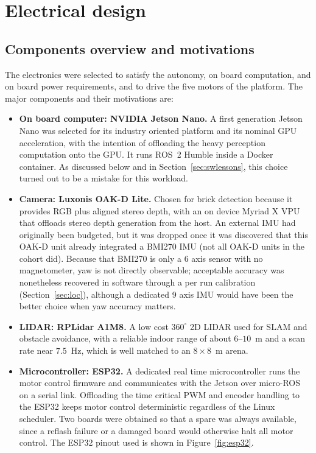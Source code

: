 \documentclass[11pt]{article}
\begin{document}
\section{Electrical design}\label{sec:electrical}

\subsection{Components overview and motivations}
The electronics were selected to satisfy the autonomy, on board computation, and on board power requirements, and to drive the five motors of the platform. The major components and their motivations are:
\begin{itemize}[noitemsep]
    \item \textbf{On board computer: NVIDIA Jetson Nano.} A first generation Jetson Nano was selected for its industry oriented platform and its nominal GPU acceleration, with the intention of offloading the heavy perception computation onto the GPU. It runs ROS~2 Humble inside a Docker container. As discussed below and in Section~\ref{sec:swlessons}, this choice turned out to be a mistake for this workload.
    \item \textbf{Camera: Luxonis OAK-D Lite.} Chosen for brick detection because it provides RGB plus aligned stereo depth, with an on device Myriad X VPU that offloads stereo depth generation from the host. An external IMU had originally been budgeted, but it was dropped once it was discovered that this OAK-D unit already integrated a BMI270 IMU (not all OAK-D units in the cohort did). Because that BMI270 is only a 6 axis sensor with no magnetometer, yaw is not directly observable; acceptable accuracy was nonetheless recovered in software through a per run calibration (Section~\ref{sec:loc}), although a dedicated 9 axis IMU would have been the better choice when yaw accuracy matters.
    \item \textbf{LIDAR: RPLidar A1M8.} A low cost $360^\circ$ 2D LIDAR used for SLAM and obstacle avoidance, with a reliable indoor range of about $6$--$10$~m and a scan rate near $7.5$~Hz, which is well matched to an $8 \times 8$~m arena.
    \item \textbf{Microcontroller: ESP32.} A dedicated real time microcontroller runs the motor control firmware and communicates with the Jetson over micro-ROS on a serial link. Offloading the time critical PWM and encoder handling to the ESP32 keeps motor control deterministic regardless of the Linux scheduler. Two boards were obtained so that a spare was always available, since a reflash failure or a damaged board would otherwise halt all motor control. The ESP32 pinout used is shown in Figure~\ref{fig:esp32}.

\end{itemize}
\end{document}
